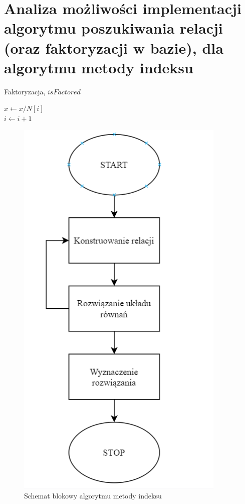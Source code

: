 \documentclass[]{article}
\begin{document}
\section{Analiza możliwości implementacji algorytmu poszukiwania relacji (oraz faktoryzacji w bazie), dla algorytmu metody indeksu}

\begin{algorithm}
	\SetAlgoLined
	\caption{Faktoryzacja, \(isFactored\)}
	\label{Faktor}
	{
		{
			\(x \gets x/N[i]\)\\
		}
		\(i \gets i + 1\)
	}
	{
	}
\end{algorithm}

\begin{figure}[h]
	\begin{center}
		\includegraphics[width=10cm]{./img/schemat_1.png}
		\caption{Schemat blokowy algorytmu metody indeksu}
	\end{center}
\end{figure}
\end{document}

